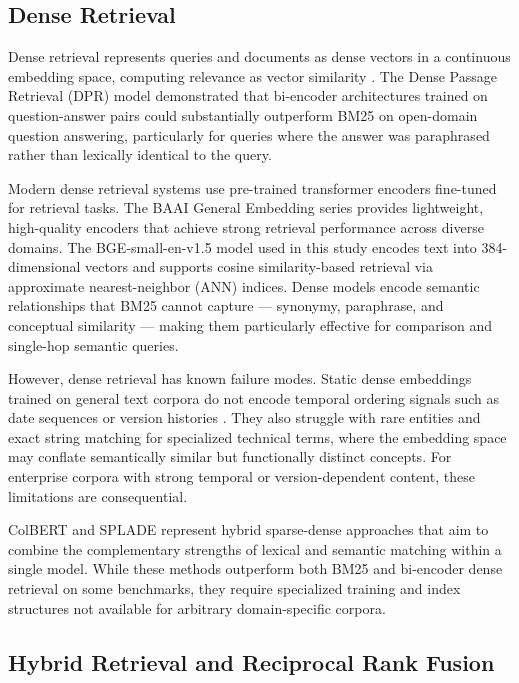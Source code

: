 \subsection{Dense Retrieval}
Dense retrieval represents queries and documents as dense vectors in a continuous embedding space, computing relevance as vector similarity \citep{karpukhin2020dpr}. The Dense Passage Retrieval (DPR) model demonstrated that bi-encoder architectures trained on question-answer pairs could substantially outperform BM25 on open-domain question answering, particularly for queries where the answer was paraphrased rather than lexically identical to the query.

Modern dense retrieval systems use pre-trained transformer encoders fine-tuned for retrieval tasks. The BAAI General Embedding series \citep{xiao2023bge} provides lightweight, high-quality encoders that achieve strong retrieval performance across diverse domains. The BGE-small-en-v1.5 model used in this study encodes text into 384-dimensional vectors and supports cosine similarity-based retrieval via approximate nearest-neighbor (ANN) indices. Dense models encode semantic relationships that BM25 cannot capture --- synonymy, paraphrase, and conceptual similarity --- making them particularly effective for comparison and single-hop semantic queries.

However, dense retrieval has known failure modes. Static dense embeddings trained on general text corpora do not encode temporal ordering signals such as date sequences or version histories \citep{manning2008ir}. They also struggle with rare entities and exact string matching for specialized technical terms, where the embedding space may conflate semantically similar but functionally distinct concepts. For enterprise corpora with strong temporal or version-dependent content, these limitations are consequential.

ColBERT \citep{khattab2020colbert} and SPLADE \citep{formal2021splade} represent hybrid sparse-dense approaches that aim to combine the complementary strengths of lexical and semantic matching within a single model. While these methods outperform both BM25 and bi-encoder dense retrieval on some benchmarks, they require specialized training and index structures not available for arbitrary domain-specific corpora.

\subsection{Hybrid Retrieval and Reciprocal Rank Fusion}

